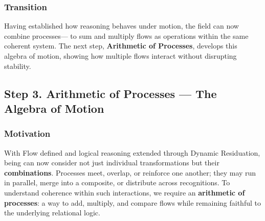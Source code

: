 \documentclass[11pt]{article}
\begin{document}
\subsubsection*{Transition}
\label{sec:org50ff155}
Having established how reasoning behaves under motion,  
the field can now combine processes—  
to sum and multiply flows as operations within the same coherent system.  
The next step, \textbf{Arithmetic of Processes}, develops this algebra of motion,  
showing how multiple flows interact without disrupting stability.
\subsection*{Step 3. Arithmetic of Processes — The Algebra of Motion}
\label{sec:org87bc8e2}

\subsubsection*{Motivation}
\label{sec:orgdcab46a}
With Flow defined and logical reasoning extended through Dynamic Residuation,  
being can now consider not just individual transformations but their \textbf{combinations}.  
Processes meet, overlap, or reinforce one another;  
they may run in parallel, merge into a composite, or distribute across recognitions.  
To understand coherence within such interactions,  
we require an \textbf{arithmetic of processes}:  
a way to add, multiply, and compare flows while remaining faithful to the underlying relational logic.
\end{document}
